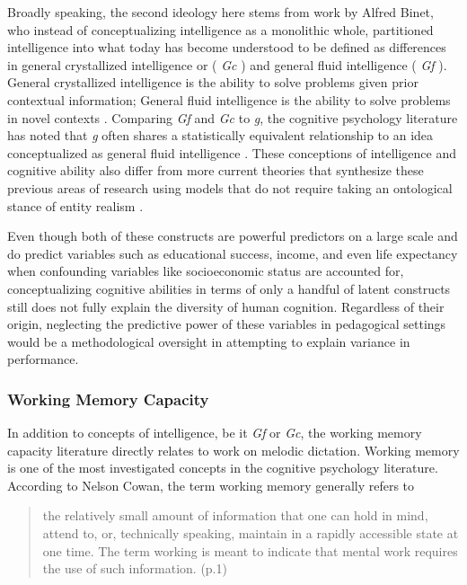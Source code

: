 \documentclass[12pt,]{book}
\begin{document}
Broadly speaking, the second ideology here stems from work by Alfred Binet, who instead of conceptualizing intelligence as a monolithic whole, partitioned intelligence into what today has become understood to be defined as differences in general crystallized intelligence or ( \emph{Gc} ) and general fluid intelligence ( \emph{Gf} ).
General crystallized intelligence is the ability to solve problems given prior contextual information;
General fluid intelligence is the ability to solve problems in novel contexts \citep{cattellAbilitiesTheirGrowth1971, jhornTheoryFluidCrystalized1994} .
Comparing \emph{Gf} and \emph{Gc} to \emph{g}, the cognitive psychology literature has noted that \emph{g} often shares a statistically equivalent relationship to an idea conceptualized as general fluid intelligence \citep{matzkeIssuePowerIdentification2010}.
These conceptions of intelligence and cognitive ability also differ from more current theories that synthesize these previous areas of research \citep{kovacsProcessOverlapTheory2016} using models that do not require taking an ontological stance of entity realism \citep{borsboomTheoreticalStatusLatent2003}.

Even though both of these constructs are powerful predictors on a large scale and do predict variables such as educational success, income, and even life expectancy \citep{ritchieIntelligenceAllThat2015} when confounding variables like socioeconomic status are accounted for, conceptualizing cognitive abilities in terms of only a handful of latent constructs still does not fully explain the diversity of human cognition.
Regardless of their origin, neglecting the predictive power of these variables in pedagogical settings would be a methodological oversight in attempting to explain variance in performance.

\hypertarget{working-memory-capacity}{%
\subsubsection{Working Memory Capacity}\label{working-memory-capacity}}

In addition to concepts of intelligence, be it \emph{Gf} or \emph{Gc}, the working memory capacity literature directly relates to work on melodic dictation.
Working memory is one of the most investigated concepts in the cognitive psychology literature.
According to Nelson Cowan, the term working memory generally refers to

\begin{quote}
the relatively small amount of information that one can hold in mind, attend to, or, technically speaking, maintain in a rapidly accessible state at one time. The term working is meant to indicate that mental work requires the use of such information. (p.1) \citep{cowanWorkingMemoryCapacity2005}
\end{quote}
\end{document}
